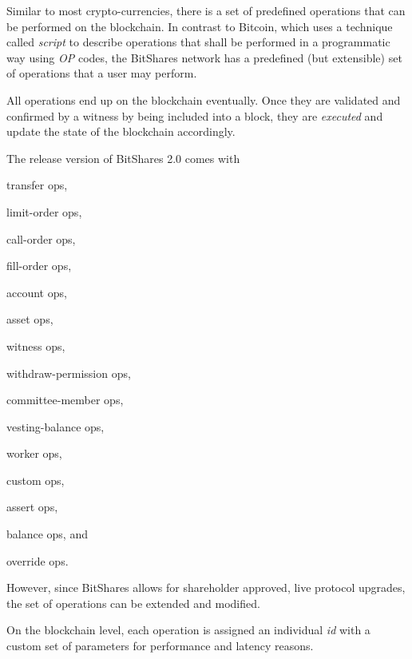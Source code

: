 Similar to most crypto-currencies, there is a set of predefined operations that
can be performed on the blockchain. In contrast to Bitcoin, which uses a
technique called \emph{script} to describe operations that shall be performed
in a programmatic way using \emph{OP} codes, the BitShares network has a
predefined (but extensible) set of operations that a user may perform.

All operations end up on the blockchain eventually. Once they are validated and
confirmed by a witness by being included into a block, they are \emph{executed}
and update the state of the blockchain accordingly.

The release version of BitShares 2.0 comes with 
\begin{inparaenum}[(a)]
 \item transfer ops,
 \item limit-order ops,
 \item call-order ops,
 \item fill-order ops,
 \item account ops,
 \item asset ops,
 \item witness ops,
 \item withdraw-permission ops,
 \item committee-member ops,
 \item vesting-balance ops,
 \item worker ops,
 \item custom ops,
 \item assert ops,
 \item balance ops, and
 \item override ops.
\end{inparaenum}
However, since BitShares allows for shareholder approved, live protocol
upgrades, the set of operations can be extended and modified. 

On the blockchain level, each operation is assigned an individual \emph{id}
with a custom set of parameters for performance and latency reasons.

